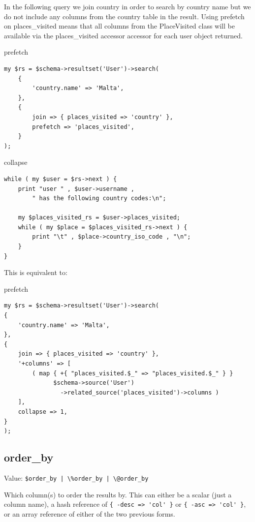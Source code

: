 In the following query we join country in order to search by country name
but we do not include any columns from the country table in the
result. Using prefetch on places\_visited means that all columns from the PlaceVisited
class will be available via the places\_visited accessor accessor for each user
object returned.

\begin{frame}[fragile]{prefetch}
\begin{lstlisting}
my $rs = $schema->resultset('User')->search(
    {
        'country.name' => 'Malta',
    },
    {
        join => { places_visited => 'country' },
        prefetch => 'places_visited',
    }
);
\end{lstlisting}
\end{frame}

\begin{frame}[fragile]{collapse}
\begin{lstlisting}
while ( my $user = $rs->next ) {
    print "user " , $user->username ,
        " has the following country codes:\n";

    my $places_visited_rs = $user->places_visited;
    while ( my $place = $places_visited_rs->next ) {
        print "\t" , $place->country_iso_code , "\n";
    }
}
\end{lstlisting}
\end{frame}



This is equivalent to:

\begin{frame}[fragile]{prefetch}
\begin{lstlisting}
my $rs = $schema->resultset('User')->search(
{
    'country.name' => 'Malta',
},
{
    join => { places_visited => 'country' },
    '+columns' => [
        ( map { +{ "places_visited.$_" => "places_visited.$_" } }
              $schema->source('User')
                ->related_source('places_visited')->columns )
    ],
    collapse => 1,
}
);
\end{lstlisting}
\end{frame}

\subsection{order\_by}

Value: \verb=$order_by | \%order_by | \@order_by=

Which column(s) to order the results by. This can either be a scalar (just a
column name), a hash reference of \verb|{ -desc => 'col' }| or 
\verb|{ -asc => 'col' }|, or an array reference of either of the two
previous forms.

